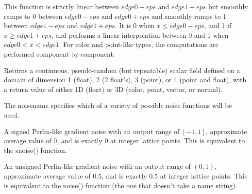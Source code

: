 \documentclass[11pt,letterpaper]{book}
\def\color{{\cf color}\xspace}
\def\float{{\cf float}\xspace}
\def\normal{{\cf normal}\xspace}
\def\point{{\cf point}\xspace}
\def\vector{{\cf vector}\xspace}
\begin{document}
This function is strictly linear between ${\mathit edge0}+{\mathit eps}$ and ${\mathit edge1}-{\mathit eps}$
but smoothly ramps to 0 between ${\mathit edge0}-{\mathit eps}$ and ${\mathit edge0}+{\mathit eps}$
and smoothly ramps to 1 between ${\mathit edge1}-{\mathit eps}$ and ${\mathit edge1}+{\mathit eps}$.
It is 0 when $x \le {\mathit edge0}-{\mathit eps}$, and 1 if $x \ge {\mathit edge1}+{\mathit eps}$,
and performs a linear
interpolation between 0 and 1 when ${\mathit edge0} < x < {\mathit edge1}$.
For \color and \point-like types, the computations are
performed component-by-component.
\apiend


%


Returns a continuous, pseudo-random (but repeatable) scalar field
defined on a domain of dimension 1 (\float), 2 (2 \float's), 3 (\point),
or 4 (\point and \float), with a return value of either 1D (\float) or 3D
(\color, \point, \vector, or \normal).

The {\cf noisename} specifies which of a variety of possible noise
functions will be used.  

\vspace{12pt}

A signed Perlin-like gradient noise with an output range of $[-1,1]$,
approximate average value of $0$, and is exactly $0$ at integer lattice
points.  This is equivalent to the {\cf snoise()} function.

\apiend
\vspace{-16pt}

\vspace{12pt}
An unsigned Perlin-like gradient noise with an output range of $(0,1)$,
approximate average value of $0.5$, and is exactly $0.5$ at integer
lattice points.  This is equivalent to the {\cf noise()} function (the
one that doesn't take a name string).
\apiend
\vspace{-16pt}
\end{document}
